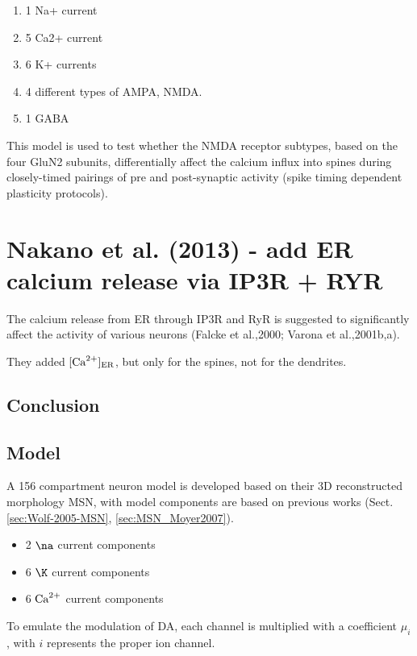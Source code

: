 \begin{enumerate}
  \item 1 Na+ current
  
  \item 5 Ca2+ current
  
  \item 6 K+ currents
  
  \item 4 different types of AMPA, NMDA. 
  
  \item 1 GABA
\end{enumerate}

This model is used to test whether the NMDA receptor subtypes, based on the four
GluN2 subunits, differentially affect the calcium influx into spines during
closely-timed pairings of pre and post-synaptic activity (spike timing dependent
plasticity protocols).


\section{Nakano et al. (2013) - add ER calcium release via IP3R + RYR}

The calcium release from ER through IP3R and RyR is suggested to significantly
affect the activity of various neurons (Falcke et al.,2000; Varona et
al.,2001b,a).

They added $[{\text{Ca}^{2+}}]_{\text{ER}}$, but only for the spines, not for the dendrites.


\subsection{Conclusion}

\subsection{Model}

A 156 compartment neuron model is developed based on their 3D reconstructed
morphology MSN, with model components are based on previous works
(Sect.\ref{sec:Wolf-2005-MSN}, \ref{sec:MSN_Moyer2007}).
\begin{itemize}
  \item 2 $\na$ current components
  \item 6 $\K$ current components
  \item 6 ${\text{Ca}^{2+}}$ current components
\end{itemize}

To emulate the modulation of DA, each channel is multiplied with a coefficient
$\mu_i$, with $i$ represents the proper ion channel. 

